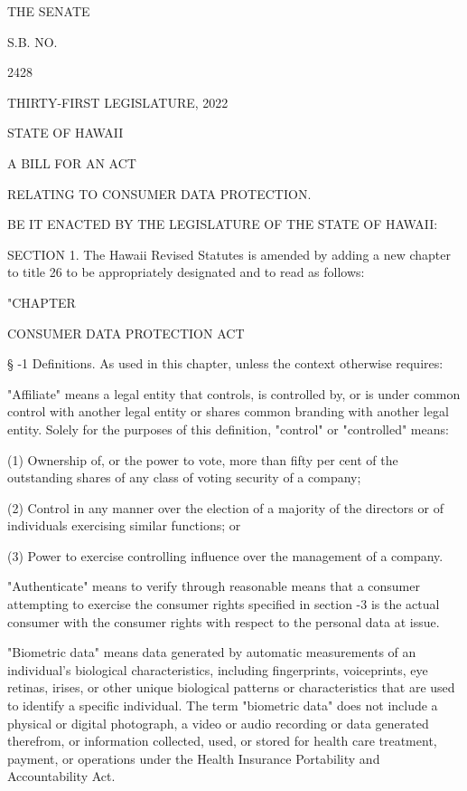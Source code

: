 THE SENATE

S.B. NO.

2428

THIRTY-FIRST LEGISLATURE, 2022

 

STATE OF HAWAII

 

 

 

 

 

 

A BILL FOR AN ACT

 

 

RELATING TO CONSUMER DATA PROTECTION.

 

 

BE IT ENACTED BY THE LEGISLATURE OF THE STATE OF HAWAII:

 


     SECTION 1.  The Hawaii Revised Statutes is amended by adding a new chapter to title 26 to be appropriately designated and to read as follows:

"CHAPTER

CONSUMER DATA PROTECTION ACT

     §   -1  Definitions.  As used in this chapter, unless the context otherwise requires:

     "Affiliate" means a legal entity that controls, is controlled by, or is under common control with another legal entity or shares common branding with another legal entity.  Solely for the purposes of this definition, "control" or "controlled" means:

     (1)  Ownership of, or the power to vote, more than fifty per cent of the outstanding shares of any class of voting security of a company;

     (2)  Control in any manner over the election of a majority of the directors or of individuals exercising similar functions; or

     (3)  Power to exercise controlling influence over the management of a company.

     "Authenticate" means to verify through reasonable means that a consumer attempting to exercise the consumer rights specified in section    -3 is the actual consumer with the consumer rights with respect to the personal data at issue.

     "Biometric data" means data generated by automatic measurements of an individual's biological characteristics, including fingerprints, voiceprints, eye retinas, irises, or other unique biological patterns or characteristics that are used to identify a specific individual.  The term "biometric data" does not include a physical or digital photograph, a video or audio recording or data generated therefrom, or information collected, used, or stored for health care treatment, payment, or operations under the Health Insurance Portability and Accountability Act.

